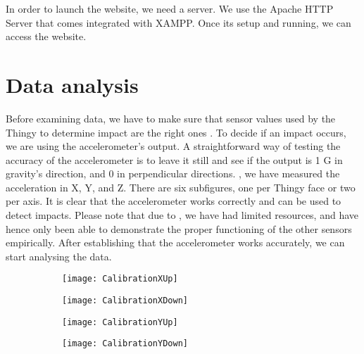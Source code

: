 In order to launch the website, we need a server. We use the Apache HTTP Server that comes integrated with XAMPP. Once its setup and running, we can access the website.

\section{Data analysis}

Before examining data, we have to make sure that sensor values used by the Thingy to determine impact are the right ones . To decide if an impact occurs, we are using the accelerometer's output. A straightforward way of testing the accuracy of the accelerometer is to leave it still and see if the output is 1 G in gravity's direction, and 0 in perpendicular directions. , we have measured the acceleration in X, Y, and Z. There are six subfigures, one per Thingy face or two per axis. It is clear that the accelerometer works correctly and can be used to detect impacts. Please note that due to \cov, we have had limited resources, and have hence only been able to demonstrate the proper functioning of the other sensors empirically. After establishing that the accelerometer works accurately, we can start analysing the data.

\begin{figure}[hbt!]
	\centering
	\begin{subfigure}{0.48\linewidth}
		\centering
		\texttt{[image: CalibrationXUp]}
	\end{subfigure}
	\begin{subfigure}{0.48\linewidth}
		\centering
		\texttt{[image: CalibrationXDown]}
	\end{subfigure}
\end{figure}

\begin{figure}[hbt!]\ContinuedFloat
	\centering
	\begin{subfigure}{0.48\linewidth}
		\centering
		\texttt{[image: CalibrationYUp]}
	\end{subfigure}
	\begin{subfigure}{0.48\linewidth}
		\centering
		\texttt{[image: CalibrationYDown]}
	\end{subfigure}
\end{figure}


